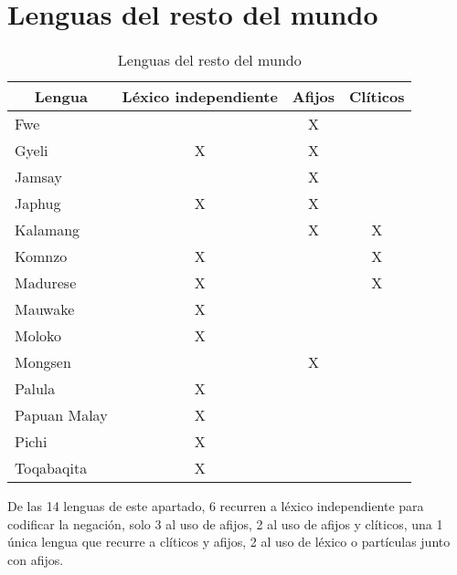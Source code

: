 \section*{Lenguas del resto del mundo}

\begin{table}[htbp]
\centering
\begin{tabular}{lccc}
\multicolumn{1}{c}{\textbf{Lengua}} & \textbf{Léxico independiente} & \textbf{Afijos} & \textbf{Clíticos} \\
\hline
Fwe   &       & X     &  \\
Gyeli & X     & X     &  \\
Jamsay &       & X     &  \\
Japhug & X     & X     &  \\
Kalamang &       & X     & X \\
Komnzo & X     &       & X \\
Madurese & X     &       & X \\
Mauwake & X     &       &  \\
Moloko & X     &       &  \\
Mongsen &       & X     &  \\
Palula & X     &       &  \\
Papuan Malay & X     &       &  \\
Pichi & X     &       &  \\
Toqabaqita & X     &       &  \\
\hline
\end{tabular}
\caption{Lenguas del resto del mundo}
\label{cuadro13}
\end{table}

De las 14 lenguas de este apartado, 6 recurren a léxico independiente para codificar la negación, solo 3 al uso de afijos, 2 al uso de afijos y clíticos, una 1 única lengua que recurre a clíticos y afijos, 2 al uso de léxico o partículas junto con afijos.


